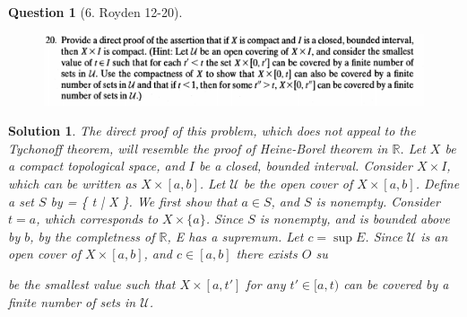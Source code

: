 \documentclass{article} %
\def\eQb#1\eQe{\begin{eqnarray*}#1\end{eqnarray*}}
\theoremstyle{quest}
\newtheorem*{question}{Question}
\newtheorem*{solution}{Solution}
\begin{document}
\begin{question}[6. Royden 12-20]
\hfill
\begin{figure}[h!]
  \centering
    \includegraphics[width=1\textwidth]{12-20}
\end{figure}
\end{question}
\begin{solution}
The direct proof of this problem, which does not appeal to the Tychonoff
theorem, will resemble the proof of Heine-Borel theorem in $\mathbb{R}$.
Let $X$ be a compact topological space, and $I$ be a closed, bounded
interval. Consider $X \times I$, which can be written as $X \times [a,b]$.
Let $\mathscr{U}$ be the open cover of $X \times [a,b]$. Define a set $S$
by 
\eQb
S = \{ t \in [a,b] \> | \> X \times [a,t] \>  \>  \}. 
\eQe
We first show that $a \in S$, and $S$ is nonempty. Consider $t = a$,
which corresponds to $X \times \{ a \}$. Since $S$ is nonempty, and 
is bounded above by $b$, by the completness of $\mathbb{R}$, E has 
a supremum. Let $c = \sup E$. Since $\mathscr{U}$ is an open 
cover of $X \times [a,b]$, and $c \in [a,b]$ there exists $O$
su
 
be the smallest value such that $X \times [a,t']$ for any $t' \in
[a,t)$ can be covered by a finite number of sets in $\mathscr{U}$. 
\end{solution}
\end{document}
